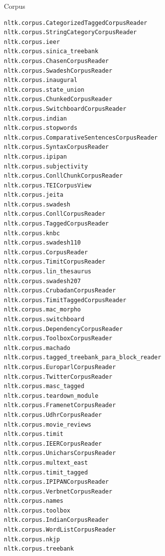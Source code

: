 \documentclass[11pt]{beamer}
\begin{document}
\begin{frame}[fragile]{Corpus}
\begin{itemize}
{\begin{verbatim}
nltk.corpus.CategorizedTaggedCorpusReader               nltk.corpus.StringCategoryCorpusReader                  nltk.corpus.ieer                                        nltk.corpus.sinica_treebank
nltk.corpus.ChasenCorpusReader                          nltk.corpus.SwadeshCorpusReader                         nltk.corpus.inaugural                                   nltk.corpus.state_union
nltk.corpus.ChunkedCorpusReader                         nltk.corpus.SwitchboardCorpusReader                     nltk.corpus.indian                                      nltk.corpus.stopwords
nltk.corpus.ComparativeSentencesCorpusReader            nltk.corpus.SyntaxCorpusReader                          nltk.corpus.ipipan                                      nltk.corpus.subjectivity
nltk.corpus.ConllChunkCorpusReader                      nltk.corpus.TEICorpusView                               nltk.corpus.jeita                                       nltk.corpus.swadesh
nltk.corpus.ConllCorpusReader                           nltk.corpus.TaggedCorpusReader                          nltk.corpus.knbc                                        nltk.corpus.swadesh110
nltk.corpus.CorpusReader                                nltk.corpus.TimitCorpusReader                           nltk.corpus.lin_thesaurus                               nltk.corpus.swadesh207
nltk.corpus.CrubadanCorpusReader                        nltk.corpus.TimitTaggedCorpusReader                     nltk.corpus.mac_morpho                                  nltk.corpus.switchboard
nltk.corpus.DependencyCorpusReader                      nltk.corpus.ToolboxCorpusReader                         nltk.corpus.machado                                     nltk.corpus.tagged_treebank_para_block_reader
nltk.corpus.EuroparlCorpusReader                        nltk.corpus.TwitterCorpusReader                         nltk.corpus.masc_tagged                                 nltk.corpus.teardown_module
nltk.corpus.FramenetCorpusReader                        nltk.corpus.UdhrCorpusReader                            nltk.corpus.movie_reviews                               nltk.corpus.timit
nltk.corpus.IEERCorpusReader                            nltk.corpus.UnicharsCorpusReader                        nltk.corpus.multext_east                                nltk.corpus.timit_tagged
nltk.corpus.IPIPANCorpusReader                          nltk.corpus.VerbnetCorpusReader                         nltk.corpus.names                                       nltk.corpus.toolbox
nltk.corpus.IndianCorpusReader                          nltk.corpus.WordListCorpusReader                        nltk.corpus.nkjp                                        nltk.corpus.treebank

\end{verbatim}}
\end{itemize}
\end{frame}
\end{document}
